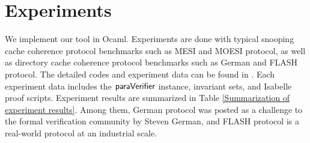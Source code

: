 \documentclass[conference]{IEEEtran}
\begin{document}
{\section{Experiments}
\vspace{-5pt}
We implement our tool in Ocaml. %
  Experiments are
done with typical snooping cache coherence protocol benchmarks such as MESI and MOESI protocol, as well as
 directory cache coherence protocol benchmarks such as  German and FLASH protocol. The detailed codes and experiment data can
be found in \cite{LiCache16}. Each experiment data includes the
${\sf paraVerifier}$ instance, invariant sets, and Isabelle proof
scripts.  Experiment results are summarized in Table \ref{Summarization of experiment results}. Among them,  German protocol was posted
as a challenge to the formal verification community by
Steven German, and FLASH protocol is a real-world protocol  at an industrial scale.


}
\end{document}
